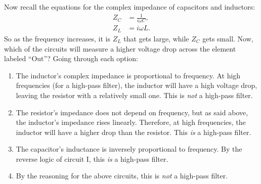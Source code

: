 \documentclass[11pt]{paper}
\begin{document}
Now recall the equations for the complex impedance of capacitors and inductors:
\begin{align}
Z_C &= \frac{1}{i\omega C},\\
Z_L &= i\omega L.
\end{align}
So as the frequency increases, it is $Z_L$ that gets large, while $Z_C$ gets small.  Now, which of the circuits will measure a higher voltage drop across the element labeled ``Out''?  Going through each option:
\begin{enumerate}[label=\Roman*.]
\item The inductor's complex impedance is proportional to frequency.  At high frequencies (for a high-pass filter), the inductor will have a high voltage drop, leaving the resistor with a relatively small one.  This is \emph{not} a high-pass filter.\\
\item The resistor's impedance does not depend on frequency, but as said above, the inductor's impedance rises linearly.  Therefore, at high frequencies, the inductor will have a higher drop than the resistor.  This \emph{is} a high-pass filter.\\
\item The capacitor's inductance is inversely proportional to frequency.  By the reverse logic of circuit I, this \emph{is} a high-pass filter.\\
\item By the reasoning for the above circuits, this is \emph{not} a high-pass filter.
\end{enumerate}
\end{document}
